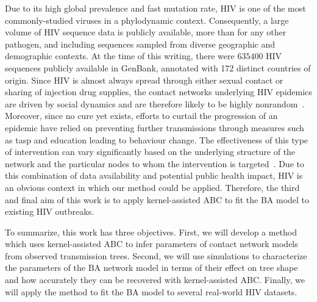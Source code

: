 Due to its high global prevalence and fast mutation rate, \gls{HIV} is one of
the most commonly-studied viruses in a phylodynamic context. Consequently, a
large volume of \gls{HIV} sequence data is publicly available, more than for
any other pathogen, and including sequences sampled from diverse geographic and
demographic contexts. At the time of this writing, there were $635400$ HIV
sequences publicly available in GenBank, annotated with 172 distinct countries
of origin. Since \gls{HIV} is almost always spread through either sexual
contact or sharing of injection drug supplies, the contact networks underlying
\gls{HIV} epidemics are driven by social dynamics and are therefore likely to
be highly nonrandom~\autocite{clemenccon2015statistical}. Moreover, since no
cure yet exists, efforts to curtail the progression of an epidemic have relied
on preventing further transmissions through measures such as \gls{tasp} and
education leading to behaviour change. The effectiveness of this type of
intervention can vary significantly based on the underlying structure of the
network and the particular nodes to whom the intervention is
targeted~\autocite{little2014using,wang2015targeting}. Due to this combination
of data availability and potential public health impact, \gls{HIV} is an
obvious context in which our method could be applied. Therefore, the third and
final aim of this work is to apply kernel-assisted \gls{ABC} to fit the
\gls{BA} model to existing \gls{HIV} outbreaks.

To summarize, this work has three objectives. First, we will develop a method
which uses kernel-assisted \gls{ABC} to infer parameters of contact network
models from observed transmission trees. Second, we will use simulations to
characterize the parameters of the \gls{BA} network model in terms of their
effect on tree shape and how accurately they can be recovered with
kernel-assisted \gls{ABC}. Finally, we will apply the method to fit the
\gls{BA} model to several real-world \gls{HIV} datasets.

